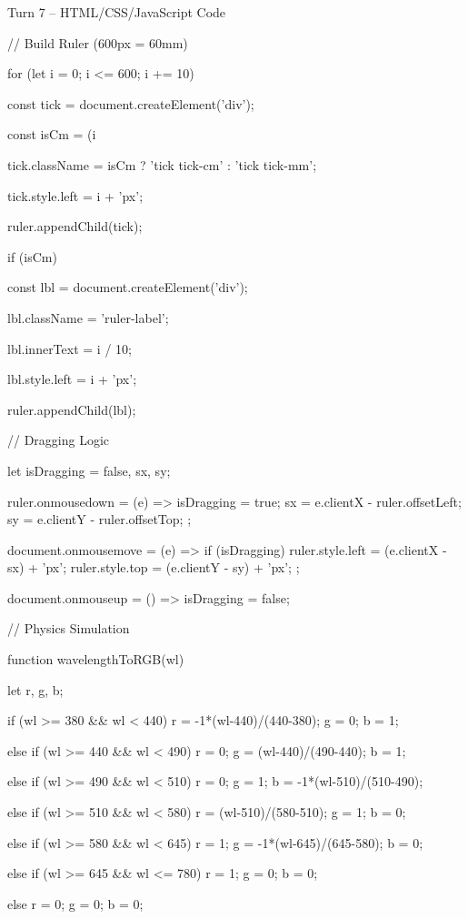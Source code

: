\documentclass[10pt,a4paper]{article}
\begin{document}
\begin{htmlcodebox}{Turn 7 -- HTML/CSS/JavaScript Code}
{{{{{// Build Ruler (600px = 60mm)

for (let i = 0; i <= 600; i += 10) {

    const tick = document.createElement('div');

    const isCm = (i %

    tick.className = isCm ? 'tick tick-cm' : 'tick tick-mm';

    tick.style.left = i + 'px';

    ruler.appendChild(tick);

    if (isCm) {

        const lbl = document.createElement('div');

        lbl.className = 'ruler-label';

        lbl.innerText = i / 10;

        lbl.style.left = i + 'px';

        ruler.appendChild(lbl);

    }

}

// Dragging Logic

let isDragging = false, sx, sy;

ruler.onmousedown = (e) => { isDragging = true; sx = e.clientX - ruler.offsetLeft; sy = e.clientY - ruler.offsetTop; };


document.onmousemove = (e) => { if (isDragging) { ruler.style.left = (e.clientX - sx) + 'px'; ruler.style.top = (e.clientY - sy) + 'px'; } };

document.onmouseup = () => isDragging = false;

// Physics Simulation

function wavelengthToRGB(wl) {

    let r, g, b;

    if (wl >= 380 && wl < 440) { r = -1*(wl-440)/(440-380); g = 0; b = 1; }

    else if (wl >= 440 && wl < 490) { r = 0; g = (wl-440)/(490-440); b = 1; }

    else if (wl >= 490 && wl < 510) { r = 0; g = 1; b = -1*(wl-510)/(510-490); }

    else if (wl >= 510 && wl < 580) { r = (wl-510)/(580-510); g = 1; b = 0; }

    else if (wl >= 580 && wl < 645) { r = 1; g = -1*(wl-645)/(645-580); b = 0; }

    else if (wl >= 645 && wl <= 780) { r = 1; g = 0; b = 0; }

    else { r = 0; g = 0; b = 0; }

}}}}}}
\end{htmlcodebox}
\end{document}
